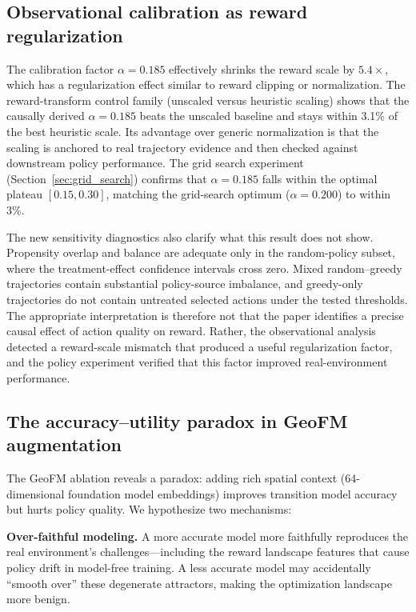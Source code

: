 \documentclass[11pt]{article}
\begin{document}
\subsection{Observational calibration as reward regularization}

The calibration factor $\alpha = 0.185$ effectively shrinks the reward scale by $5.4\times$, which has a regularization effect similar to reward clipping or normalization. The reward-transform control family (unscaled versus heuristic scaling) shows that the causally derived $\alpha = 0.185$ beats the unscaled baseline and stays within 3.1\% of the best heuristic scale. Its advantage over generic normalization is that the scaling is anchored to real trajectory evidence and then checked against downstream policy performance. The grid search experiment (Section~\ref{sec:grid_search}) confirms that $\alpha = 0.185$ falls within the optimal plateau $[0.15, 0.30]$, matching the grid-search optimum ($\alpha = 0.200$) to within 3\%.

The new sensitivity diagnostics also clarify what this result does not show. Propensity overlap and balance are adequate only in the random-policy subset, where the treatment-effect confidence intervals cross zero. Mixed random--greedy trajectories contain substantial policy-source imbalance, and greedy-only trajectories do not contain untreated selected actions under the tested thresholds. The appropriate interpretation is therefore not that the paper identifies a precise causal effect of action quality on reward. Rather, the observational analysis detected a reward-scale mismatch that produced a useful regularization factor, and the policy experiment verified that this factor improved real-environment performance.

\subsection{The accuracy--utility paradox in GeoFM augmentation}

The GeoFM ablation reveals a paradox: adding rich spatial context (64-dimensional foundation model embeddings) improves transition model accuracy but hurts policy quality. We hypothesize two mechanisms:

\textbf{Over-faithful modeling.} A more accurate model more faithfully reproduces the real environment's challenges---including the reward landscape features that cause policy drift in model-free training. A less accurate model may accidentally ``smooth over'' these degenerate attractors, making the optimization landscape more benign.
\end{document}
